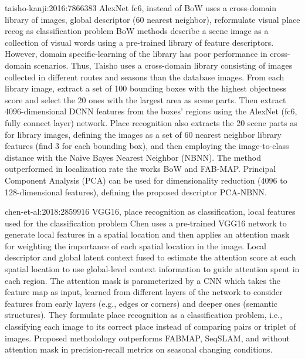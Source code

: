 
taisho-kanji:2016:7866383 AlexNet fc6, instead of BoW uses a cross-domain library of images, global descriptor (60 nearest neighbor), reformulate visual place recog as classification problem
BoW methods describe a scene image as a collection of visual words using a pre-trained library of feature descriptors. However, domain specific-learning of the library has poor performance in cross-domain scenarios. Thus, Taisho uses a cross-domain library consisting of images collected in different routes and seasons than the database images. From each library image, extract a set of 100 bounding boxes with the highest objectness score and select the 20 ones with the largest area as scene parts. Then extract 4096-dimensional DCNN features from the boxes' regions using the AlexNet (fc6, fully connect layer) network. Place recognition also extracts the 20 scene parts as for library images, defining the images as a set of 60 nearest neighbor library features (find 3 for each bounding box), and then employing the image-to-class distance with the Naive Bayes Nearest Neighbor (NBNN). The method outperformed in localization rate the works BoW and FAB-MAP.
Principal Component Analysis (PCA) can be used for dimensionality reduction (4096 to 128-dimensional features), defining the proposed descriptor PCA-NBNN.

chen-et-al:2018:2859916 VGG16, place recognition as classification, local features used for the classification problem
Chen uses a pre-trained VGG16 network to generate local features in a spatial location and then applies an attention mask for weighting the importance of each spatial location in the image. Local descriptor and global latent context fused to estimate the attention score at each spatial location to use global-level context information to guide attention spent in each region.  The attention mask is parameterized by a CNN which takes the feature map as input, learned from different layers of the network to consider features from early layers (e.g., edges or corners) and deeper ones (semantic structures). They formulate place recognition as a classification problem, i.e., classifying each image to its correct place instead of comparing pairs or triplet of images.
Proposed methodology outperforms FABMAP, SeqSLAM, and without attention mask in precision-recall metrics on seasonal changing conditions.




